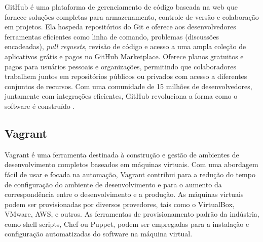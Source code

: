 GitHub é uma plataforma de gerenciamento de código baseada na web que fornece soluções completas para 
armazenamento, controle de versão e colaboração em projetos. Ela hospeda repositórios do Git e oferece 
aos desenvolvedores ferramentas eficientes como linha de comando, problemas (discussões encadeadas), 
\textit{pull requests}, revisão de código e acesso a uma ampla coleção de aplicativos grátis e pagos no 
GitHub Marketplace. Oferece planos gratuitos e pagos para usuários pessoais e organizações, permitindo 
que colaboradores trabalhem juntos em repositórios públicos ou privados com acesso a diferentes conjuntos 
de recursos. Com uma comunidade de 15 milhões de desenvolvedores, juntamente com integrações eficientes, 
GitHub revoluciona a forma como o software é construído \cite{github}.

\subsection{Vagrant}

Vagrant é uma ferramenta destinada à construção e gestão de ambientes de desenvolvimento completos 
baseados em máquinas virtuais. Com uma abordagem fácil de usar e focada na automação, Vagrant contribui 
para a redução do tempo de configuração do ambiente de desenvolvimento e para o aumento da correspondência 
entre o desenvolvimento e a produção. As máquinas virtuais podem ser provisionadas por diversos provedores, 
tais como o VirtualBox, VMware, AWS, e outros. As ferramentas de provisionamento padrão da indústria, 
como shell scripts, Chef ou Puppet, podem ser empregadas para a instalação e configuração automatizadas 
do software na máquina virtual.
